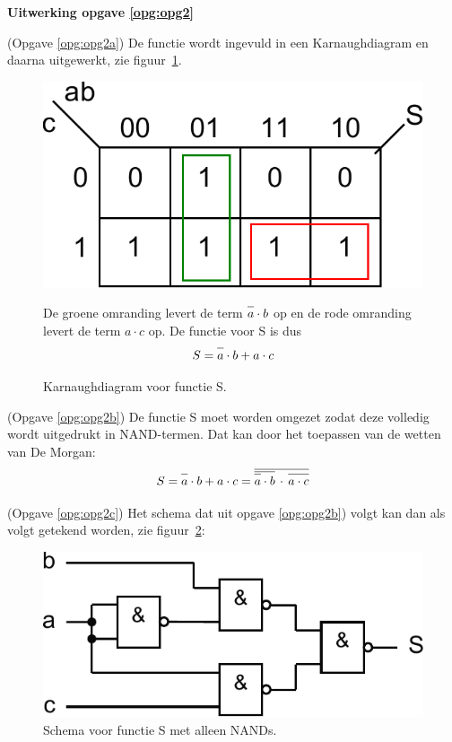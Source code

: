 \documentclass[a4paper,12pt,addpoints,fleqn,dutch,concept]{tisdexam}
\newcommand*{\oline}[1]{\overline{#1\mathstrut}}
\begin{document}
\begin{questions}
\newpage
\textbf{Uitwerking opgave \ref{opg:opg2}}

(Opgave \ref{opg:opg2a}) De functie wordt ingevuld in een Karnaughdiagram en daarna
uitgewerkt, zie figuur~\ref{fig:ant_opgave2a_kmaps}.

\begin{figure}[H]
  \begin{minipage}[c]{0.50\linewidth}
    \centering
	\includegraphics[scale=0.50]{pINLDIG2014_opgave2a_kmaps.pdf}
    \caption{Karnaughdiagram voor functie S.}
    \label{fig:ant_opgave2a_kmaps}
  \end{minipage}
  \begin{minipage}[c]{.40\linewidth}
  De groene omranding levert de term $\oline{a} \cdot b$ op en de rode
  omranding levert de term $a \cdot c$ op. De functie voor S is dus
  \begin{equation*}
  S = \oline{a} \cdot b + a \cdot c
  \end{equation*}
  \end{minipage}\hfill
\end{figure}

(Opgave \ref{opg:opg2b}) De functie S moet worden omgezet zodat deze volledig
wordt uitgedrukt in NAND-termen. Dat kan door het toepassen van de wetten van
De Morgan:
\begin{equation*}
S = \oline{a} \cdot b + a \cdot c = \oline{\oline{\oline{a} \cdot b} \, \cdot \, \oline{a \cdot c}}
\end{equation*}

(Opgave \ref{opg:opg2c}) Het schema dat uit opgave \ref{opg:opg2b}) volgt kan
dan als volgt getekend worden, zie figuur~\ref{fig:ant_opgave2c_schema}:

\begin{figure}[H]
  \centering
  \includegraphics[scale=0.63]{pINLDIG2014_opgave2c_schema.pdf}
  \caption{Schema voor functie S met alleen NANDs.}
  \label{fig:ant_opgave2c_schema}
\end{figure}



\end{questions}
\end{document}
